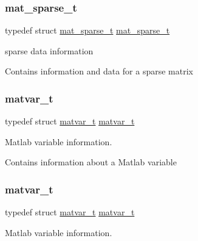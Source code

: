\subsubsection{\texorpdfstring{mat\+\_\+sparse\+\_\+t}{mat\_sparse\_t}\hspace{0.1cm}{\footnotesize\ttfamily [2/2]}}
{\footnotesize\ttfamily typedef struct \hyperlink{group___m_a_t_structmat__sparse__t}{mat\+\_\+sparse\+\_\+t}  \hyperlink{group___m_a_t_structmat__sparse__t}{mat\+\_\+sparse\+\_\+t}}



sparse data information 

Contains information and data for a sparse matrix \mbox{\label{group___m_a_t_ga24775c96a2a6d073581639c780b7896c}} 
\subsubsection{\texorpdfstring{matvar\+\_\+t}{matvar\_t}\hspace{0.1cm}{\footnotesize\ttfamily [1/2]}}
{\footnotesize\ttfamily typedef struct \hyperlink{group___m_a_t_structmatvar__t}{matvar\+\_\+t}  \hyperlink{group___m_a_t_structmatvar__t}{matvar\+\_\+t}}



Matlab variable information. 

Contains information about a Matlab variable \mbox{\label{group___m_a_t_ga24775c96a2a6d073581639c780b7896c}} 
\subsubsection{\texorpdfstring{matvar\+\_\+t}{matvar\_t}\hspace{0.1cm}{\footnotesize\ttfamily [2/2]}}
{\footnotesize\ttfamily typedef struct \hyperlink{group___m_a_t_structmatvar__t}{matvar\+\_\+t}  \hyperlink{group___m_a_t_structmatvar__t}{matvar\+\_\+t}}



Matlab variable information. 

